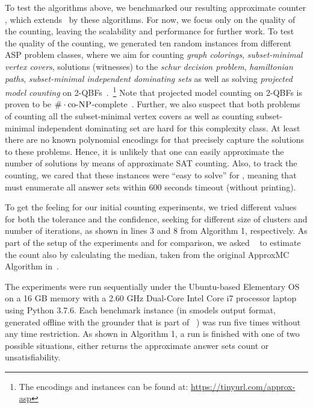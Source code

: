 To test the algorithms above, we benchmarked our resulting approximate counter \xampler, which extends \xorro\, by these algorithms.
For now, we focus only on the quality of the counting, leaving the scalability and performance for further work.
%
To test the quality of the counting,
we generated ten random instances from different ASP problem classes, where we aim for counting \emph{graph colorings}, \emph{subset-minimal vertex covers}, solutions (witnesses) to the \emph{schur decision problem}, \emph{hamiltonian paths}, \emph{subset-minimal independent dominating sets} as well as solving \emph{projected model counting} on 2-QBFs~\cite{DurandHermannKolaitis05,KleineBuningLettman99}.~\footnote{The encodings and instances can be found at: \url{https://tinyurl.com/approx-asp}}
Note that projected model counting on 2-QBFs is proven to be $\#\cdot\text{co-}\textsc{NP}$-complete~\cite{DurandHermannKolaitis05}. Further, we also suspect that both problems of counting all the subset-minimal vertex covers as well as counting subset-minimal independent dominating set are hard for this complexity class. At least there are no known polynomial encodings for \SAT that precisely capture the solutions to these problems. Hence, it is unlikely that one can easily approximate the number of solutions by means of approximate SAT counting.
Also, to track the counting, we cared that these instances were ``easy to solve'' for \clingo{},
meaning that \clingo{} must enumerate all answer sets within 600 seconds timeout (without printing).

To get the feeling for our initial counting experiments, we tried different values for both the tolerance and the confidence, seeking for different size of clusters and number of iterations,
as shown in lines 3 and 8 from Algorithm 1, respectively.
As part of the setup of the experiments and for comparison, we asked \xorro{}~\cite{DBLP:conf/lpnmr/EverardoJKS19}  to estimate the count also by calculating the median, taken from the original ApproxMC Algorithm in~\cite{ChakrabortyMV13}.

The experiments were run sequentially under the Ubuntu-based Elementary OS on a 16 GB memory with a 2.60 GHz Dual-Core Intel Core i7 processor laptop using Python 3.7.6.
Each benchmark instance (in smodels output format, generated offline with the grounder \gringo{} that is part of \clingo{}~\cite{DBLP:conf/iclp/GebserKKOSW16}) was run five times without any time restriction. 
As shown in Algorithm 1, a run is finished with one of two possible situations, either \xorro{} returns the approximate answer sets count or unsatisfiability.

